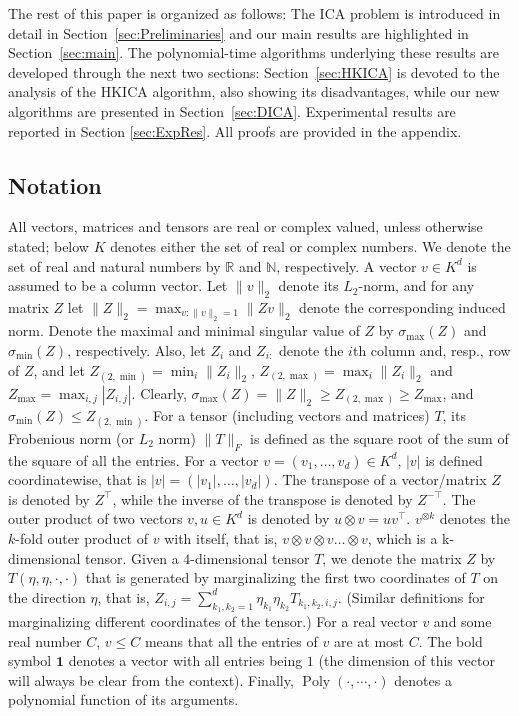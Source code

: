 \documentclass[twoside,11pt]{article}
\newcommand{\real}{\mathbb{R}}
\renewcommand{\natural}{\mathbb{N}}
\DeclareMathOperator{\pol}{Poly}
\newcommand{\poly}[1]{\pol\left(#1\right)}
\begin{document}
The rest of this paper is organized as follows: 
The ICA problem is introduced in detail in Section~\ref{sec:Preliminaries} and  our main results are highlighted in Section~\ref{sec:main}.
The polynomial-time algorithms underlying these results are developed through the next two sections: Section~\ref{sec:HKICA} is devoted to the analysis of the HKICA algorithm, also showing its disadvantages, while our new algorithms are presented in Section~\ref{sec:DICA}.
Experimental results are reported in Section \ref{sec:ExpRes}.
All proofs are provided in the appendix.

\subsection{Notation}
All vectors, matrices and tensors are real or complex valued, unless otherwise stated; below $K$ denotes either the set of real or complex numbers. We denote the set of real and natural numbers by $\real$ and $\natural$, respectively.
A vector $v \in K^d$ is assumed to be a column vector.
Let $\|v\|_2$ denote its $L_2$-norm, and for any matrix $Z$ let $\|Z\|_2=\max_{v:\|v\|_2=1}{\|Z v\|_2}$ denote the corresponding induced norm. Denote the maximal and minimal singular value of $Z$ by $\sigma_{\max}(Z)$ and  $\sigma_{\min}(Z)$, respectively. Also, let $Z_i$ and $Z_{i:}$ denote the $i$th column and, resp., row of $Z$, and let $Z_{(2,\min)} = \min_{i} \|Z_i\|_2$, $Z_{(2,\max)} = \max_{i} \|Z_i\|_2$ and $Z_{\max} = \max_{i,j} |Z_{i,j}|$. 
Clearly, $\sigma_{\max}(Z) =\|Z\|_2 \ge Z_{(2,\max)} \ge Z_{\max}$, and $\sigma_{\min}(Z) \le Z_{(2,\min)}$. For a tensor (including vectors and matrices) $T$, its Frobenious norm (or $L_2$ norm) $\|T\|_F$  is defined as the square root of the sum of the square of all the entries.  
For a vector $v=(v_1,\ldots,v_d) \in K^d$, $\vert v \vert$ is defined coordinatewise, that is $\vert v \vert=(\vert v_1 \vert,\ldots,\vert v_d\vert)$. 
The transpose of a vector/matrix $Z$ is denoted by $Z^\top$, while the inverse of the transpose is denoted by $Z^{-\top}$.  
The outer product of two vectors $v, u \in K^d$ is denoted by $u\otimes v=u v^\top$. 
$v^{\otimes k}$ denotes the $k$-fold outer product of $v$ with itself, that is, $v\otimes v\otimes v \ldots \otimes v$, which is a k-dimensional tensor.
Given a $4$-dimensional tensor $T$, we denote the matrix $Z$ by $T(\eta,\eta,\cdot , \cdot)$ that is generated by marginalizing the first two coordinates of $T$ on the direction $\eta$, that is,
$Z_{i,j} = \sum_{k_1,k_2 = 1}^{d} \eta_{k_1} \eta_{k_2} T_{k_1,k_2,i,j}$. (Similar definitions for marginalizing different coordinates of the tensor.)
For a real vector $v$ and some real number $C$, $v \le C$ means that all the entries of $v$ are at most $C$. 
The bold symbol $\boldsymbol{1}$ denotes a vector with all entries being $1$ (the dimension of this vector will always be clear from the context).
Finally, $\poly{\cdot,\cdots,\cdot}$ denotes a polynomial function of its arguments.
\end{document}
